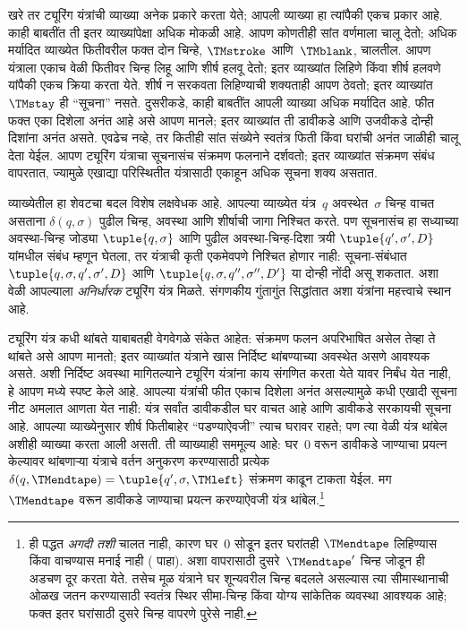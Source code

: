 \documentclass[../../../include/open-logic-section]{subfiles}
\begin{document}

खरे तर ट्यूरिंग यंत्रांची व्याख्या अनेक प्रकारे करता येते;
आपली व्याख्या हा त्यांपैकी एकच प्रकार आहे. काही बाबतींत ती
इतर व्याख्यांपेक्षा अधिक मोकळी आहे. आपण कोणतीही सांत वर्णमाला
चालू देतो; अधिक मर्यादित व्याख्येत फितीवरील फक्त दोन चिन्हे,
$\TMstroke$ आणि~$\TMblank$, चालतील. आपण यंत्राला एकाच वेळी
फितीवर चिन्ह लिहू आणि शीर्ष हलवू देतो; इतर व्याख्यांत लिहिणे
किंवा शीर्ष हलवणे यांपैकी एकच क्रिया करता येते. शीर्ष न सरकवता
लिहिण्याची शक्यताही आपण ठेवतो; इतर व्याख्यांत $\TMstay$
ही ``सूचना'' नसते. दुसरीकडे, काही बाबतींत आपली व्याख्या अधिक
मर्यादित आहे. फीत फक्त एका दिशेला अनंत आहे असे आपण मानले;
इतर व्याख्यांत ती डावीकडे आणि उजवीकडे दोन्ही दिशांना अनंत
असते. एवढेच नव्हे, तर कितीही सांत संख्येने स्वतंत्र फिती किंवा घरांची
अनंत जाळीही चालू देता येईल. आपण ट्यूरिंग यंत्राचा सूचनासंच
संक्रमण फलनाने दर्शवतो; इतर व्याख्यांत संक्रमण संबंध वापरतात,
ज्यामुळे एखाद्या परिस्थितीत यंत्रासाठी एकाहून अधिक सूचना
शक्य असतात.

व्याख्येतील हा शेवटचा बदल विशेष लक्षवेधक आहे. आपल्या व्याख्येत
यंत्र~$q$ अवस्थेत~$\sigma$ चिन्ह वाचत असताना
$\delta(q, \sigma)$ पुढील चिन्ह, अवस्था आणि शीर्षाची जागा
निश्चित करते. पण सूचनासंच हा सध्याच्या अवस्था-चिन्ह जोड्या
$\tuple{q,
  \sigma}$ आणि पुढील अवस्था-चिन्ह-दिशा त्रयी $\tuple{q', \sigma',
  D}$ यांमधील संबंध म्हणून घेतला, तर यंत्राची कृती एकमेवपणे
निश्चित होणार नाही: सूचना-संबंधात $\tuple{q,
  \sigma, q', \sigma', D}$ आणि $\tuple{q, \sigma, q'', \sigma'', D'}$
या दोन्ही नोंदी असू शकतात. अशा वेळी आपल्याला
\emph{अनिर्धारक} ट्यूरिंग यंत्र मिळते. संगणकीय गुंतागुंत
सिद्धांतात अशा यंत्रांना महत्त्वाचे स्थान आहे.

ट्यूरिंग यंत्र कधी थांबते याबाबतही वेगवेगळे संकेत आहेत:
संक्रमण फलन अपरिभाषित असेल तेव्हा ते थांबते असे आपण मानतो;
इतर व्याख्यांत यंत्राने खास निर्दिष्ट थांबण्याच्या अवस्थेत
असणे आवश्यक असते. अशी निर्दिष्ट अवस्था मागितल्याने ट्यूरिंग
यंत्रांना काय संगणित करता येते यावर निर्बंध येत नाही, हे आपण
 मध्ये स्पष्ट केले आहे. आपल्या यंत्रांची फीत
एकाच दिशेला अनंत असल्यामुळे कधी एखादी सूचना नीट अमलात
आणता येत नाही: यंत्र सर्वांत डावीकडील घर वाचत आहे आणि
डावीकडे सरकायची सूचना आहे. आपल्या व्याख्येनुसार शीर्ष
फितीबाहेर ``पडण्याऐवजी'' त्याच घरावर राहते; पण त्या वेळी
यंत्र थांबेल अशीही व्याख्या करता आली असती. ती व्याख्याही
सममूल्य आहे: घर~$0$ वरून डावीकडे जाण्याचा प्रयत्न केल्यावर
थांबणाऱ्या यंत्राचे वर्तन अनुकरण करण्यासाठी प्रत्येक
$\delta(q,\TMendtape) =
\tuple{q',\sigma,\TMleft}$ संक्रमण काढून टाकता येईल.
मग~$\TMendtape$ वरून डावीकडे जाण्याचा प्रयत्न करण्याऐवजी
यंत्र थांबेल.\footnote{ही पद्धत \emph{अगदी तशी} चालत नाही,
कारण घर~$0$ सोडून इतर घरांतही $\TMendtape$ लिहिण्यास किंवा
वाचण्यास मनाई नाही ( पाहा). अशा वापरासाठी
दुसरे~$\TMendtape'$ चिन्ह जोडून ही अडचण दूर करता येते.
तसेच मूळ यंत्राने घर शून्यवरील चिन्ह बदलले असल्यास त्या सीमास्थानाची
ओळख जतन करण्यासाठी स्वतंत्र स्थिर सीमा-चिन्ह किंवा योग्य सांकेतिक
व्यवस्था आवश्यक आहे; फक्त इतर घरांसाठी दुसरे चिन्ह वापरणे पुरेसे नाही.}
%
\end{document}
